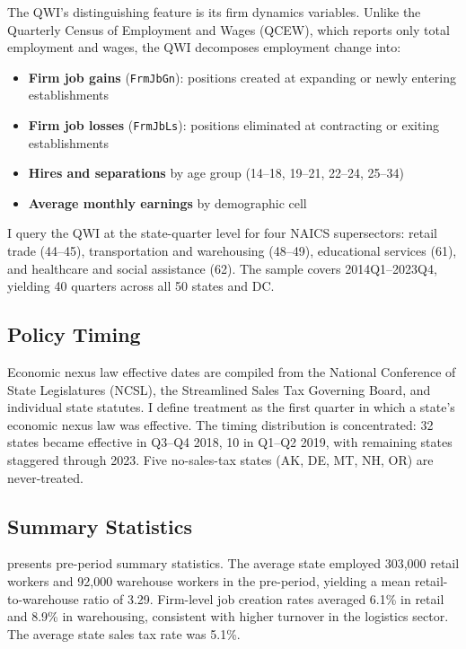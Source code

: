 \documentclass[12pt]{article}
\begin{document}
The QWI's distinguishing feature is its firm dynamics variables. Unlike the Quarterly Census of Employment and Wages (QCEW), which reports only total employment and wages, the QWI decomposes employment change into:
\begin{itemize}
  \item \textbf{Firm job gains} (\texttt{FrmJbGn}): positions created at expanding or newly entering establishments
  \item \textbf{Firm job losses} (\texttt{FrmJbLs}): positions eliminated at contracting or exiting establishments
  \item \textbf{Hires and separations} by age group (14--18, 19--21, 22--24, 25--34)
  \item \textbf{Average monthly earnings} by demographic cell
\end{itemize}

I query the QWI at the state-quarter level for four NAICS supersectors: retail trade (44--45), transportation and warehousing (48--49), educational services (61), and healthcare and social assistance (62). The sample covers 2014Q1--2023Q4, yielding 40 quarters across all 50 states and DC.

\subsection{Policy Timing}

Economic nexus law effective dates are compiled from the National Conference of State Legislatures (NCSL), the Streamlined Sales Tax Governing Board, and individual state statutes. I define treatment as the first quarter in which a state's economic nexus law was effective. The timing distribution is concentrated: 32 states became effective in Q3--Q4 2018, 10 in Q1--Q2 2019, with remaining states staggered through 2023. Five no-sales-tax states (AK, DE, MT, NH, OR) are never-treated.

\subsection{Summary Statistics}



 presents pre-period summary statistics. The average state employed 303,000 retail workers and 92,000 warehouse workers in the pre-period, yielding a mean retail-to-warehouse ratio of 3.29. Firm-level job creation rates averaged 6.1\% in retail and 8.9\% in warehousing, consistent with higher turnover in the logistics sector. The average state sales tax rate was 5.1\%.
\end{document}
